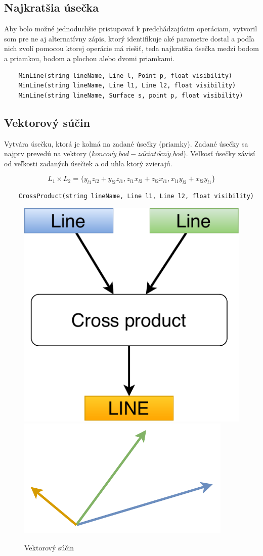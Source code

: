 \subsection{Najkratšia úsečka}
Aby bolo možné jednoduchšie pristupovať k predchádzajúcim operáciam, vytvoril som pre ne aj alternatívny zápis, ktorý identifikuje aké parametre dostal a podľa nich zvolí pomocou ktorej operácie má riešiť, teda najkratšia úsečka medzi bodom a priamkou, bodom a plochou alebo dvomi priamkami.

\begin{lstlisting}
	MinLine(string lineName, Line l, Point p, float visibility)
	MinLine(string lineName, Line l1, Line l2, float visibility)
	MinLine(string lineName, Surface s, point p, float visibility)
\end{lstlisting}




\subsection{Vektorový súčin}\label{subsec:crossproduct}
Vytvára úsečku, ktorá je kolmá na zadané úsečky (priamky). Zadané úsečky sa najprv prevedú na vektory ($koncov\acute{y}\_bod - za\check{c}iato\check{c}n\acute{y}\_bod$).
Veľkosť úsečky závisí od veľkosti zadaných úsečiek a od uhla ktorý zvierajú. 

\begin{equation}
 L_1 \times L_2 =  \{
 y_{l1} z_{l2} + y_{l2} z_{l1} ,
 z_{l1} x_{l2} + z_{l2} x_{l1} ,
 x_{l1} y_{l2} + x_{l2} y_{l1}\}
    \label{eq:cross}
\end{equation}


\begin{lstlisting}
	CrossProduct(string lineName, Line l1, Line l2, float visibility)
\end{lstlisting}

\begin{figure}[H]
	\centering
	\includegraphics[height=0.3\textwidth]{obrazky-figures/Diagram/Line/DP Navrh operacii-1D - LineCross.pdf}
	\includegraphics[height=0.3\textwidth]{obrazky-figures/Diagram/Draw/2Line/DP Navrh operacii-1D - LineCross.pdf}
	\caption{Vektorový súčin}
	\label{fig:1}
\end{figure}

